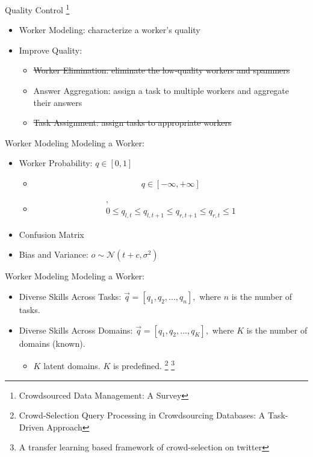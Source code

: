 \documentclass{beamer}
\begin{document}
\begin{frame}{Quality Control \footnote{Crowdsourced Data Management: A Survey}}
    \begin{itemize}
        \item Worker Modeling: characterize a worker's quality
        \item Improve Quality:
        \begin{itemize}
            \item \sout{Worker Elimination: eliminate the low-quality workers and spammers}
            \item Answer Aggregation: assign a task to multiple workers and aggregate their answers
            \item \sout{Task Assignment: assign tasks to appropriate workers}
        \end{itemize}
    \end{itemize}
\end{frame}

\begin{frame}{Worker Modeling}
    Modeling a Worker:
    \begin{itemize}
        \item Worker Probability: $q \in [0, 1]$
        \begin{itemize}
            \item \begin{gather*}
                q \in [-\infty, +\infty]
            \end{gather*}
            \item \begin{gather*}
                [q_{l, t}, q_{r, t}], \\
                0 \leq q_{l, t} \leq q_{l, t+1} \leq q_{r, t+1} \leq q_{r, t} \leq 1
            \end{gather*}
        \end{itemize}
        \item Confusion Matrix
        \item Bias and Variance: $o \sim \mathcal{N} (t+c, \sigma^2)$
    \end{itemize}
\end{frame}

\begin{frame}{Worker Modeling}
    Modeling a Worker:
    \begin{itemize}
        \item Diverse Skills Across Tasks: $\vec{q} = [q_1, q_2, ..., q_n],$ where $n$ is the number of tasks.
        \item Diverse Skills Across Domains: $\vec{q} = [q_1, q_2, ..., q_K],$ where $K$ is the number of domains (known).
        \begin{itemize}
            \item $K$ latent domains. $K$ is predefined. \footnote{Crowd-Selection Query Processing in Crowdsourcing Databases: A Task-Driven Approach} \footnote{A transfer learning based framework of crowd-selection on twitter}
        \end{itemize}
    \end{itemize}
\end{frame}
\end{document}
